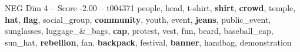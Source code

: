 \begin{textsample}{NEG Dim 4 – Score -2.00 – t004371}  \label{ex:f4_neg_028}
people, head, t-shirt, \textbf{shirt}, \textbf{crowd}, temple, \textbf{hat}, \textbf{flag}, social\_group, \textbf{community}, youth, event, \textbf{jeans}, public\_event, sunglasses, luggage\_\&\_bags, \textbf{cap}, protest, vest, fun, beard, baseball\_cap, sun\_hat, \textbf{rebellion}, fan, \textbf{backpack}, festival, \textbf{banner}, handbag, demonstration

\end{textsample}
